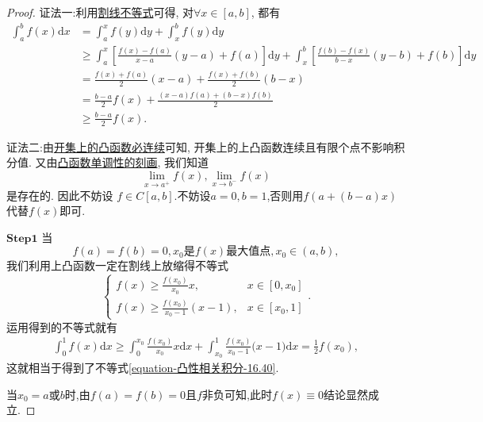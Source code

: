 \documentclass[../../main.tex]{subfiles}
\begin{document}
\begin{proof}
{\color{blue}证法一:}利用\hyperref[proposition:下凸函数的基本性质]{割线不等式}可得, 对$\forall x\in [a,b]$, 都有
\begin{align*}
\int_a^b{f\left( x \right) \mathrm{d}x}&= \int_a^x{f\left( y \right) \mathrm{d}y}+\int_x^b{f\left( y \right) \mathrm{d}y}
\\
&\geqslant \int_a^x{\left[ \frac{f\left( x \right) -f\left( a \right)}{x-a}\left( y-a \right) +f\left( a \right) \right] \mathrm{d}y}+\int_x^b{\left[ \frac{f\left( b \right) -f\left( x \right)}{b-x}\left( y-b \right) +f\left( b \right) \right] \mathrm{d}y}
\\
&=\frac{f\left( x \right) +f\left( a \right)}{2}\left( x-a \right) +\frac{f\left( x \right) +f\left( b \right)}{2}\left( b-x \right) 
\\
&=\frac{b-a}{2}f\left( x \right) +\frac{\left( x-a \right) f\left( a \right) +\left( b-x \right) f\left( b \right)}{2}
\\
&\geqslant \frac{b-a}{2}f\left( x \right) .
\end{align*}

{\color{blue}证法二:}由\hyperref[corollary:开集上的下凸函数必连续]{开集上的凸函数必连续}可知, 开集上的上凸函数连续且有限个点不影响积分值. 又由\hyperref[proposition:下凸函数的单调性刻画]{凸函数单调性的刻画}, 我们知道
\[\lim_{x \to a^+}f(x), \lim_{x \to b^-}f(x)\]
是存在的. 因此不妨设 $f \in C[a,b]$.不妨设$a=0,b=1$,否则用$f(a+(b-a)x)$代替$f(x)$即可.

$\mathbf{Step}\mathbf{1}$ 当
\[f(a) = f(b) = 0, x_0\text{是}f(x)\text{最大值点}, x_0 \in (a,b),\]
我们利用上凸函数一定在割线上放缩得不等式
\[
\begin{cases}
f(x) \geqslant   \frac{f(x_0) }{x_0 }x, &x \in [0,x_0]\\
f(x) \geqslant \frac{f(x_0) }{x_0 - 1}(x - 1), &x \in [x_0,1]
\end{cases}.
\]
运用得到的不等式就有
\begin{align*}
\int_0^1{f(x)\mathrm{d}x\geqslant \int_0^{x_0}{\frac{f(x_0)}{x_0}x}}\mathrm{d}x+\int_{x_0}^1{\frac{f(x_0)}{x_0-1}(x}-1)\mathrm{d}x=\frac{1}{2}f(x_0),
\end{align*}
这就相当于得到了不等式\eqref{equation-凸性相关积分-16.40}.

当$x_0=a\text{或}b$时,由$f(a)=f(b)=0$且$f$非负可知,此时$f(x)\equiv 0$结论显然成立.


\end{proof}
\end{document}
